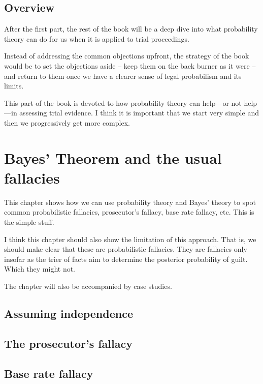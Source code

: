 \documentclass[]{book}
\begin{document}
\section*{Overview}

After the first part, the rest of the book will be a deep dive into what
probability theory can do for us when it is applied to trial
proceedings.

Instead of addressing the common objections upfront, the strategy of the
book would be to set the objections aside -- keep them on the back
burner as it were -- and return to them once we have a clearer sense of
legal probabilism and its limits.


This part of the book is devoted to how probability theory can help---or
not help---in assessing trial evidence. I think it is important that we
start very simple and then we progressively get more complex.

\chapter{Bayes' Theorem and the usual fallacies}

This chapter shows how we can use probability theory and Bayes' theory
to spot common probabilistic fallacies, prosecutor's fallacy, base rate
fallacy, etc. This is the simple stuff.

I think this chapter should also show the limitation of this approach.
That is, we should make clear that these are probabilistic fallacies.
They are fallacies only insofar as the trier of facts aim to determine
the posterior probability of guilt. Which they might not.

The chapter will also be accompanied by case studies.

\section{Assuming independence}

\section{The prosecutor's fallacy}

\section{Base rate fallacy}
\end{document}
